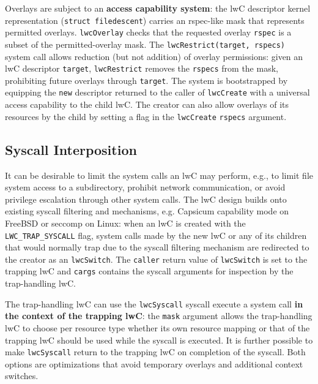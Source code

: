 \documentclass[10pt,twocolumn,a4paper]{article}
\begin{document}
Overlays are subject to an \textbf{access capability system}:
the lwC descriptor kernel representation (\lstinline{struct filedescent}) carries an rspec-like mask that represents permitted overlays.
\lstinline{lwcOverlay} checks that the requested overlay \lstinline{rspec} is a subset of the permitted-overlay mask.
The \lstinline{lwcRestrict(target, rspecs)} system call allows reduction (but not addition) of overlay permissions:
given an lwC descriptor \lstinline{target}, \lstinline{lwcRestrict} removes the \lstinline{rspecs} from the mask, prohibiting future overlays through \lstinline{target}.
The system is bootstrapped by equipping the \lstinline{new} descriptor returned to the caller of \lstinline{lwcCreate} with a universal access capability to the child lwC.
The creator can also allow overlays of its resources by the child by setting a flag %
in the \lstinline{lwcCreate} \lstinline{rspecs} argument. 
\cite{lwckernelrepo,lwcpaper}

\subsection{Syscall Interposition}\label{design:syscallinterpos}
It can be desirable to limit the system calls an lwC may perform, e.g., to limit file system access to a subdirectory, prohibit network communication, or avoid privilege escalation through other system calls.  
The lwC design builds onto existing syscall filtering and mechanisms, e.g. Capsicum capability mode on FreeBSD or seccomp on Linux:
when an lwC is created with the \lstinline{LWC_TRAP_SYSCALL} flag, system calls made by the new lwC or any of its children that would normally trap due to the syscall filtering mechanism are redirected to the creator as an \lstinline{lwcSwitch}.
The \lstinline{caller} return value of \lstinline{lwcSwitch} is set to the trapping lwC and \lstinline{cargs} contains the syscall arguments for inspection by the trap-handling lwC.
\cite{lwcpaper}

The trap-handling lwC can use the \lstinline{lwcSyscall} syscall execute a system call \textbf{in the context of the trapping lwC}:
the \lstinline{mask} argument allows the trap-handling lwC to choose per resource type whether its own resource mapping or that of the trapping lwC should be used while the syscall is executed.
It is further possible to make \lstinline{lwcSyscall} return to the trapping lwC on completion of the syscall.
Both options are optimizations that avoid temporary overlays and additional context switches.
\cite{lwcpaper,lwckernelrepo}
\end{document}

